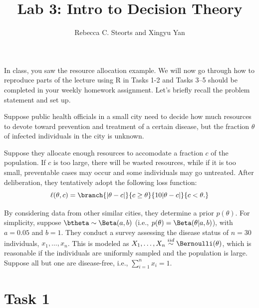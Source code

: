 \documentclass[
]{article}
\title{Lab 3: Intro to Decision Theory}
\author{Rebecca C. Steorts and Xingyu Yan}
\date{}
\begin{document}
\maketitle

In class, you saw the resource allocation example. We will now go
through how to reproduce parts of the lecture using R in Tasks 1-2 and
Tasks 3--5 should be completed in your weekly homework assignment. Let's
briefly recall the problem statement and set up.

Suppose public health officials in a small city need to decide how much
resources to devote toward prevention and treatment of a certain
disease, but the fraction \(\theta\) of infected individuals in the city
is unknown.

Suppose they allocate enough resources to accomodate a fraction \(c\) of
the population. If \(c\) is too large, there will be wasted resources,
while if it is too small, preventable cases may occur and some
individuals may go untreated. After deliberation, they tentatively adopt
the following loss function:
\[\ell(\theta,c) =\branch{|\theta-c|}{c\geq\theta}
                       {10|\theta-c|}{c<\theta.}\]

By considering data from other similar cities, they determine a prior
\(p(\theta)\). For simplicity, suppose \(\btheta\sim\Beta(a,b)\) (i.e.,
\(p(\theta) =\Beta(\theta|a,b)\)), with \(a=0.05\) and \(b=1\). They
conduct a survey assessing the disease status of \(n=30\) individuals,
\(x_1,\ldots,x_n\). This is modeled as
\(X_1,\ldots,X_n \stackrel{iid}{\sim} \Bernoulli(\theta)\), which is
reasonable if the individuals are uniformly sampled and the population
is large. Suppose all but one are disease-free, i.e.,
\(\sum_{i=1}^n x_i = 1\).

\hypertarget{task-1}{%
\section{Task 1}\label{task-1}}
\end{document}
